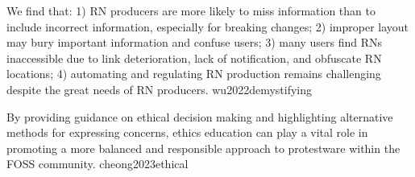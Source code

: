 \documentclass{article}
\begin{document}
  {We find that: 1) RN producers are more likely to miss information than to include incorrect information, especially for breaking changes; 2) improper layout may bury important information and confuse users; 3) many users find RNs inaccessible due to link deterioration, lack of notification, and obfuscate RN locations; 4) automating and regulating RN production remains challenging despite the great needs of RN producers.}
  {wu2022demystifying}



  {By providing guidance on ethical decision making and highlighting alternative methods for expressing concerns, ethics education can play a vital role in promoting a more balanced and responsible approach to protestware within the FOSS community.}
  {cheong2023ethical}

\end{document}
